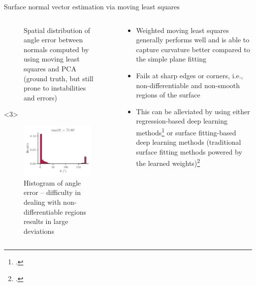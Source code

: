 \documentclass[xcolor=dvipsnames,10pt]{beamer}
\begin{document}
\begin{frame}{Surface normal vector estimation via moving least squares}
\begin{columns}[c]
\begin{column}{0.5\textwidth}
\begin{onlyenv}
\begin{center}
\begin{figure}
                    \caption{Spatial distribution of angle error between normals computed by using moving least squares and PCA (ground truth, but still prone to instabilities and errors)}
                \end{figure}
                \end{center}
            \end{onlyenv}
            \begin{onlyenv}<3>
                \begin{center}
                \begin{figure}
                    \includegraphics[width=0.95\textwidth]{artwork/ear_error_hist.pdf}
                    \caption{Histogram of angle error -- difficulty in dealing with non-differentiable regions results in large deviations}
                \end{figure}
                \end{center}
            \end{onlyenv}
        \end{column} 
        \begin{column}{0.5\textwidth}
            \begin{itemize}
                \item<1> Weighted moving least squares generally performs well and is able to capture curvature better compared to the simple plane fitting
                \item<2> Fails at sharp edges or corners, i.e., non-differentiable and non-smooth regions of the surface
                \item<3> This can be alleviated by using either regression-based deep learning methods\footcite{Charles2017PointNet,Guerrero2018PCPNet,Ben-Shabat2019Nesti-Net} or surface fitting-based deep learning methods (traditional surface fitting methods powered by the learned weights)\footcite{Lenssen2020Deep,Ben-Shabat2020DeepFit,Zhu2021AdaFit}
            \end{itemize}
        \end{column}
    \end{columns} 
\end{frame}
\end{document}
